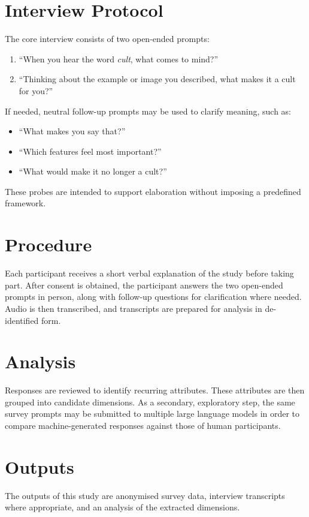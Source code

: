 \section{Interview Protocol}\label{sec:interview_protocol}
The core interview consists of two open-ended prompts:
\begin{enumerate}
	\item \enquote{When you hear the word \textit{cult}, what comes to mind?}
	\item \enquote{Thinking about the example or image you described, what makes it a cult for you?}
\end{enumerate}
If needed, neutral follow-up prompts may be used to clarify meaning, such as:
\begin{itemize}
	\item \enquote{What makes you say that?}
	\item \enquote{Which features feel most important?}
	\item \enquote{What would make it no longer a cult?}
\end{itemize}
These probes are intended to support elaboration without imposing a predefined framework.

\section{Procedure}
Each participant receives a short verbal explanation of the study before taking part. After consent is obtained, the participant answers the two open-ended prompts in person, along with follow-up questions for clarification where needed. Audio is then transcribed, and transcripts are prepared for analysis in de-identified form.

\section{Analysis}
Responses are reviewed to identify recurring attributes. These attributes are then grouped into candidate dimensions. As a secondary, exploratory step, the same survey prompts may be submitted to multiple large language models in order to compare machine-generated responses against those of human participants.

\section{Outputs}
The outputs of this study are anonymised survey data, interview transcripts where appropriate, and an analysis of the extracted dimensions.
